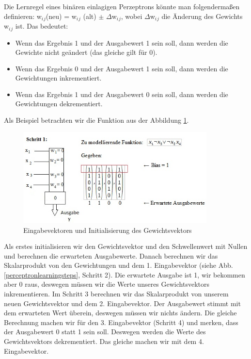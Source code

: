 Die Lernregel eines binären einlagigen Perzeptrons könnte man folgendermaßen definieren:
\newline
w$_i$$_j$(neu) = w$_i$$_j$ (alt) $\pm$ $\Delta$w$_i$$_j$,
\newline wobei $\Delta$w$_i$$_j$ die Änderung des Gewichts w$_i$$_j$ ist. Das bedeutet:
\begin{itemize}
\item Wenn das Ergebnis 1 und der Ausgabewert 1 sein soll, dann werden die Gewichte nicht geändert (das gleiche gilt für 0).
\item Wenn das Ergebnis 0 und der Ausgabewert 1 sein soll, dann werden die Gewichtungen inkrementiert.
\item Wenn das Ergebnis 1 und der Ausgabewert 0 sein soll, dann werden die Gewichtungen dekrementiert.
\end{itemize}

Als Beispiel betrachten wir die Funktion aus der Abbildung \ref{perceptronlearning}.

\begin{figure}[h]
\centering
\includegraphics[width=10cm]{chapters/neural_networks/schritt1.jpg}

\caption{Eingabevektoren und Initialisierung des Gewichtsvektors}
\label{perceptronlearning}

\end{figure}

Als erstes initialisieren wir den Gewichtsvektor und den Schwellenwert mit Nullen und berechnen die erwarteten Ausgabewerte. Danach berechnen wir das Skalarprodukt von den Gewichtungen und dem 1. Eingabevektor (siehe Abb. \ref{perceptronlearningsteps}, Schritt 2). Die erwartete Ausgabe ist 1, wir bekommen aber 0 raus, deswegen müssen wir die Werte unseres Gewichtsvektors inkrementieren. Im Schritt 3 berechnen wir das Skalarprodukt von unserem neuen Gewichtsvektor und dem 2. Eingabevektor. Der Ausgabewert stimmt mit dem erwarteten Wert überein, deswegen müssen wir nichts ändern. Die gleiche Berechnung machen wir für den 3. Eingabevektor (Schritt 4) und merken, dass der Ausgabewert 0 statt 1 sein soll. Deswegen werden  die Werte des Gewichtsvektors dekrementiert. Das gleiche machen wir mit dem 4. Eingabevektor.

